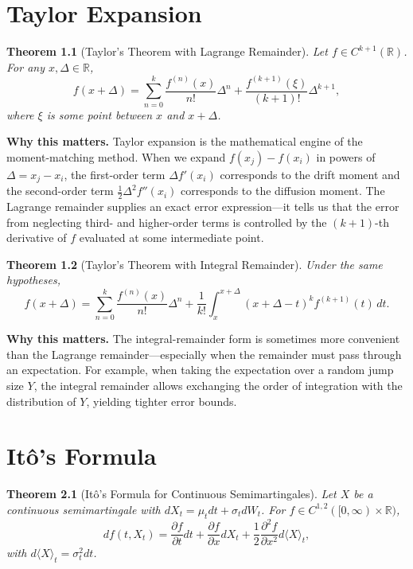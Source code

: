 \documentclass[11pt,a4paper,openany]{book}
\theoremstyle{definition}
\theoremstyle{plain}
\newtheorem{theorem}{Theorem}[chapter]
\theoremstyle{remark}
\newcommand{\1}{\mathbbm{1}}
\newcommand{\R}{\mathbb{R}}
\begin{document}
\chapter{Taylor Expansion}
\label{app:taylor}

\begin{theorem}[Taylor's Theorem with Lagrange Remainder]
Let $f \in C^{k+1}(\R)$. For any $x, \Delta \in \R$,
\[
f(x + \Delta) = \sum_{n=0}^{k} \frac{f^{(n)}(x)}{n!} \Delta^{n} + \frac{f^{(k+1)}(\xi)}{(k+1)!} \Delta^{k+1},
\]
where $\xi$ is some point between $x$ and $x + \Delta$.
\end{theorem}

\medskip
\noindent\textbf{Why this matters.} Taylor expansion is the mathematical engine of the moment-matching method. When we expand $f(x_j) - f(x_i)$ in powers of $\Delta = x_j - x_i$, the first-order term $\Delta f'(x_i)$ corresponds to the drift moment and the second-order term $\frac{1}{2}\Delta^2 f''(x_i)$ corresponds to the diffusion moment. The Lagrange remainder supplies an exact error expression---it tells us that the error from neglecting third- and higher-order terms is controlled by the $(k+1)$-th derivative of $f$ evaluated at some intermediate point.

\begin{theorem}[Taylor's Theorem with Integral Remainder]
Under the same hypotheses,
\[
f(x + \Delta) = \sum_{n=0}^{k} \frac{f^{(n)}(x)}{n!} \Delta^{n} + \frac{1}{k!} \int_{x}^{x+\Delta} (x+\Delta - t)^{k} f^{(k+1)}(t) \, dt.
\]
\end{theorem}

\medskip
\noindent\textbf{Why this matters.} The integral-remainder form is sometimes more convenient than the Lagrange remainder---especially when the remainder must pass through an expectation. For example, when taking the expectation over a random jump size $Y$, the integral remainder allows exchanging the order of integration with the distribution of $Y$, yielding tighter error bounds.

\chapter{It\^{o}'s Formula}

\begin{theorem}[It\^{o}'s Formula for Continuous Semimartingales]
Let $X$ be a continuous semimartingale with $dX_{t} = \mu_{t} dt + \sigma_{t} dW_{t}$. For $f \in C^{1,2}([0,\infty) \times \R)$,
\[
df(t, X_{t}) = \frac{\partial f}{\partial t} dt + \frac{\partial f}{\partial x} dX_{t} + \frac{1}{2} \frac{\partial^{2} f}{\partial x^{2}} d\langle X \rangle_{t},
\]
with $d\langle X \rangle_{t} = \sigma_{t}^{2} dt$.
\end{theorem}
\end{document}
